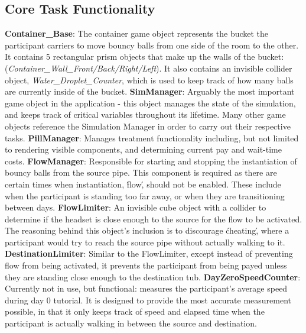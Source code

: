 \documentclass{article}
\begin{document}
\subsection{Core Task Functionality} 
\textbf{Container\_Base}: The container game object represents the bucket the participant carriers to move bouncy balls from one side of the room to the other. It contains 5 rectangular prism objects that make up the walls of the bucket: (\textit{Container\_Wall\_Front\slash Back\slash Right\slash Left}). It also contains an invisible collider object, \textit{Water\_Droplet\_Counter}, which is used to keep track of how many balls are currently inside of the bucket.\newline \newline
\textbf{SimManager}: Arguably the most important game object in the application - this object manages the state of the simulation, and keeps track of critical variables throughout its lifetime. Many other game objects reference the Simulation Manager in order to carry out their respective tasks.\newline \newline
\textbf{PillManager}: Manages treatment functionality including, but not limited to rendering visible components, and determining current pay and wait-time costs.\newline \newline
\textbf{FlowManager}: Responsible for starting and stopping the instantiation of bouncy balls from the source pipe. This component is required as there are certain times when instantiation, \'flow\', should not be enabled. These include when the participant is standing too far away, or when they are transitioning between days. \newline \newline
\textbf{FlowLimiter}: An invisible cube object with a collider to determine if the headset is close enough to the source for the flow to be activated. The reasoning behind this object's inclusion is to discourage \'cheating\', where a participant would try to reach the source pipe without actually walking to it. \newline \newline
\textbf{DestinationLimiter}: Similar to the FlowLimiter, except instead of preventing flow from being activated, it prevents the participant from being payed unless they are standing close enough to the destination tub.\newline \newline
\textbf{DayZeroSpeedCounter}: Currently not in use, but functional: measures the participant's average speed during day 0 tutorial. It is designed to provide the most accurate measurement possible, in that it only keeps track of speed and elapsed time when the participant is actually walking in between the source and destination.\newline \newline
\end{document}
